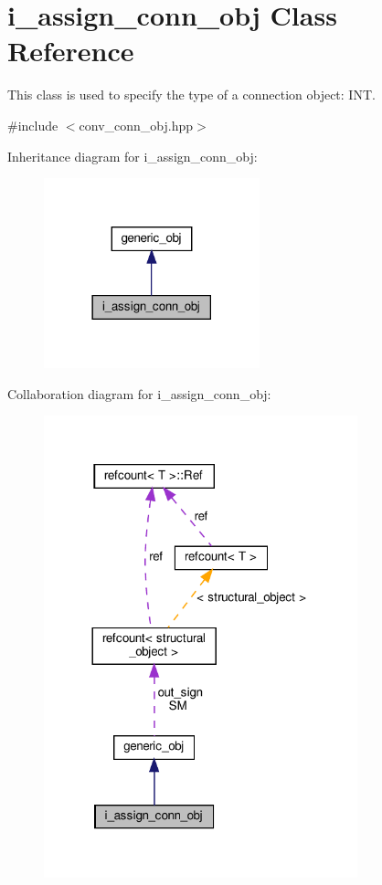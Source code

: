 \hypertarget{classi__assign__conn__obj}{}\section{i\+\_\+assign\+\_\+conn\+\_\+obj Class Reference}
\label{classi__assign__conn__obj}


This class is used to specify the type of a connection object\+: I\+NT.  




{\ttfamily \#include $<$conv\+\_\+conn\+\_\+obj.\+hpp$>$}



Inheritance diagram for i\+\_\+assign\+\_\+conn\+\_\+obj\+:
\nopagebreak
\begin{figure}[H]
\begin{center}
\leavevmode
\includegraphics[width=177pt]{db/d65/classi__assign__conn__obj__inherit__graph}
\end{center}
\end{figure}


Collaboration diagram for i\+\_\+assign\+\_\+conn\+\_\+obj\+:
\nopagebreak
\begin{figure}[H]
\begin{center}
\leavevmode
\includegraphics[width=257pt]{d3/d50/classi__assign__conn__obj__coll__graph}
\end{center}
\end{figure}
